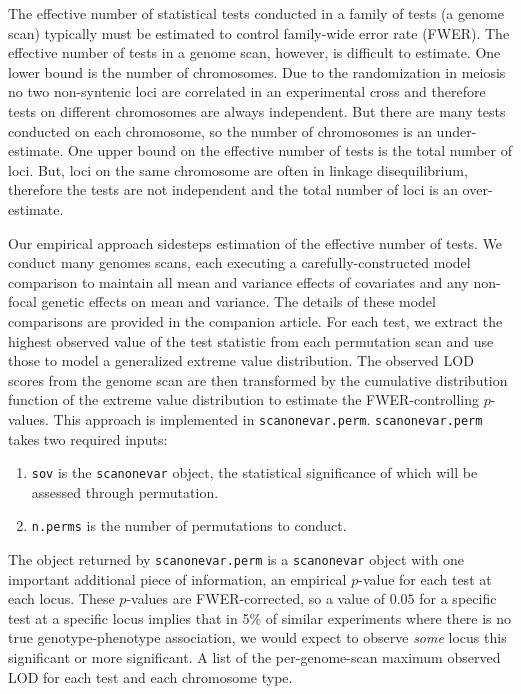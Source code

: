 \documentclass[9pt,twocolumn,twoside]{gsag3jnl}
\begin{document}
The effective number of statistical tests conducted in a family of tests (a genome scan) typically must be estimated to control family-wide error rate (FWER).
The effective number of tests in a genome scan, however, is difficult to estimate.
One lower bound is the number of chromosomes.
Due to the randomization in meiosis no two non-syntenic loci are correlated in an experimental cross and therefore tests on different chromosomes are always independent.
But there are many tests conducted on each chromosome, so the number of chromosomes is an under-estimate.
One upper bound on the effective number of tests is the total number of loci.
But, loci on the same chromosome are often in linkage disequilibrium, therefore the tests are not independent and the total number of loci is an over-estimate.

Our empirical approach sidesteps estimation of the effective number of tests.
We conduct many genomes scans, each executing a carefully-constructed model comparison to maintain all mean and variance effects of covariates and any non-focal genetic effects on mean and variance.
The details of these model comparisons are provided in the companion article.
For each test, we extract the highest observed value of the test statistic from each permutation scan and use those to model a generalized extreme value distribution.
The observed LOD scores from the genome scan are then transformed by the cumulative distribution function of the extreme value distribution to estimate the FWER-controlling $p$-values.
This approach is implemented in \texttt{scanonevar.perm}.
\texttt{scanonevar.perm} takes two required inputs:

\begin{enumerate}
	\item \texttt{sov} is the \texttt{scanonevar} object, the statistical significance of which will be assessed through permutation.
	\item \texttt{n.perms} is the number of permutations to conduct.
\end{enumerate}

The object returned by \texttt{scanonevar.perm} is a \texttt{scanonevar} object with one important additional piece of information, an empirical $p$-value for each test at each locus.
These $p$-values are FWER-corrected, so a value of $0.05$ for a specific test at a specific locus implies that in 5\% of similar experiments where there is no true genotype-phenotype association, we would expect to observe \textit{some} locus this significant or more significant.
A list of the per-genome-scan maximum observed LOD for each test and each chromosome type.
\end{document}
